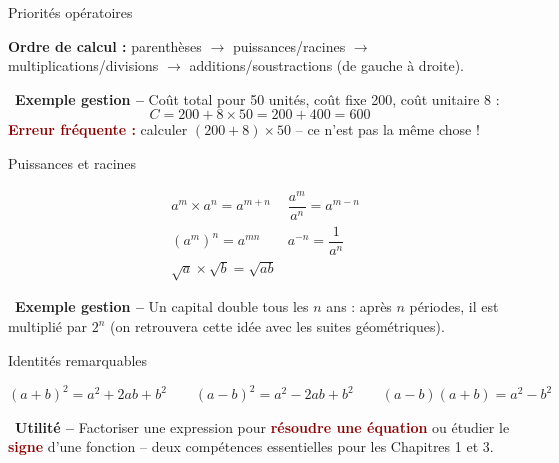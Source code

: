 \documentclass[aspectratio=169,11pt]{beamer}
\newcommand{\important}[1]{\textcolor{DarkRed}{\textbf{#1}}}
\begin{document}
	\begin{frame}{Priorités opératoires}
		\begin{definitionbox}
			\textbf{Ordre de calcul :} parenthèses $\to$ puissances/racines $\to$ multiplications/divisions
			$\to$ additions/soustractions (de gauche à droite).
		\end{definitionbox}
		
		\vspace{0.3cm}
		\begin{applicationbox}
			\faBriefcase\ \textbf{Exemple gestion --} Coût total pour 50 unités, coût fixe 200, coût
			unitaire 8 :
			\[
			C = 200 + 8 \times 50 = 200 + 400 = 600
			\]
			\pause
			\important{Erreur fréquente :} calculer $(200+8)\times 50$ -- ce n'est pas la même chose !
		\end{applicationbox}
	\end{frame}
	
	\begin{frame}{Puissances et racines}
		\begin{definitionbox}
			\begin{align*}
				& a^m \times a^n = a^{m+n} &\dfrac{a^m}{a^n}=a^{m-n}  \\
				& (a^m)^n=a^{mn} &a^{-n}=\dfrac{1}{a^n} \\
				& \sqrt{a}\times\sqrt{b}=\sqrt{ab} &  
			\end{align*}
		\end{definitionbox}
		
		\pause
		\vspace{0.3cm}
		\begin{applicationbox}
			\faBriefcase\ \textbf{Exemple gestion --} Un capital double tous les $n$ ans : après $n$
			périodes, il est multiplié par $2^n$ (on retrouvera cette idée avec les suites géométriques).
		\end{applicationbox}
	\end{frame}
	
	\begin{frame}{Identités remarquables}
		\begin{definitionbox}
			\centering
			$(a+b)^2 = a^2+2ab+b^2 \qquad (a-b)^2=a^2-2ab+b^2 \qquad (a-b)(a+b)=a^2-b^2$
		\end{definitionbox}
		
		\pause
		\vspace{0.3cm}
		\begin{applicationbox}
			\faBriefcase\ \textbf{Utilité --} Factoriser une expression pour \important{résoudre une
				équation} ou étudier le \important{signe} d'une fonction -- deux compétences essentielles
			pour les Chapitres 1 et 3.
		\end{applicationbox}
	\end{frame}
	
\end{document}
